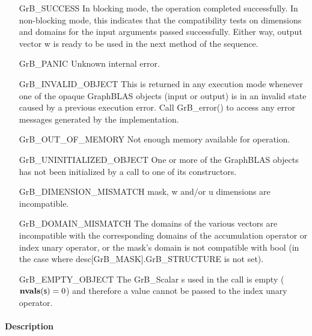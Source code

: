 \begin{itemize}[leftmargin=2.2in]
    \item[{\sf GrB\_SUCCESS}]         In blocking mode, the operation completed
    successfully. In non-blocking mode, this indicates that the compatibility 
    tests on dimensions and domains for the input arguments passed successfully. 
    Either way, output vector {\sf w} is ready to be used in the next method of 
    the sequence.

    \item[{\sf GrB\_PANIC}]           Unknown internal error.

    \item[{\sf GrB\_INVALID\_OBJECT}] This is returned in any execution mode 
    whenever one of the opaque GraphBLAS objects (input or output) is in an invalid 
    state caused by a previous execution error.  Call {\sf GrB\_error()} to access 
    any error messages generated by the implementation.

    \item[{\sf GrB\_OUT\_OF\_MEMORY}] Not enough memory available for operation.

    \item[{\sf GrB\_UNINITIALIZED\_OBJECT}] One or more of the GraphBLAS objects
    has not been initialized by a call to one of its constructors.

    \item[{\sf GrB\_DIMENSION\_MISMATCH}]  {\sf mask}, {\sf w} and/or {\sf u}
    dimensions are incompatible.

    \item[{\sf GrB\_DOMAIN\_MISMATCH}]    The domains of the various vectors are
    incompatible with the corresponding domains of the accumulation operator
    or index unary operator, or the mask's domain is not compatible with {\sf bool}
    (in the case where {\sf desc[GrB\_MASK].GrB\_STRUCTURE} is not set).

    \item[{\sf GrB\_EMPTY\_OBJECT}] The {\sf GrB\_Scalar} {\sf s} used in the call
	is empty ($\mathbf{nvals}({\sf s}) = 0$) and therefore a value
	cannot be passed to the index unary operator.
\end{itemize}

\paragraph{Description}

